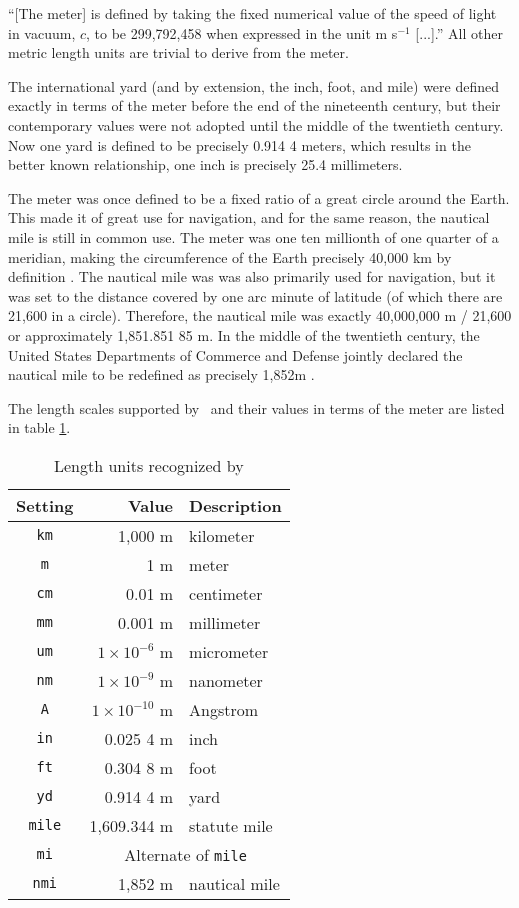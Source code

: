 ``[The meter] is defined by taking the fixed numerical value of the speed of light in vacuum, $c$, to be 299,792,458 when expressed in the unit m s$^{-1}$ [...].''\cite{bipm} All other metric length units are trivial to derive from the meter.

The international yard (and by extension, the inch, foot, and mile) were defined exactly in terms of the meter before the end of the nineteenth century, but their contemporary values were not adopted until the middle of the twentieth century.\cite{nbs:sp477}  Now one yard is defined to be precisely 0.914 4 meters, which results in the better known relationship, one inch is precisely 25.4 millimeters.

The meter was once defined to be a fixed ratio of a great circle around the Earth.  This made it of great use for navigation, and for the same reason, the nautical mile is still in common use.  The meter was one ten millionth of one quarter of a meridian, making the circumference of the Earth precisely 40,000 km by definition \cite{nbs:sp447}.  The nautical mile was was also primarily used for navigation, but it was set to the distance covered by one arc minute of latitude (of which there are 21,600 in a circle).  Therefore, the nautical mile was exactly 40,000,000 m / 21,600 or approximately 1,851.851 85 m.  In the middle of the twentieth century, the United States Departments of Commerce and Defense jointly declared the nautical mile to be redefined as precisely 1,852m \cite{nbs:59:1959}.

The length scales supported by \PM\ and their values in terms of the meter are listed in table \ref{tab:length}.

\begin{table}
\centering
\caption{Length units recognized by \PM}\label{tab:length}
\begin{tabular}{crl}
\hline
Setting & Value & Description\\
\hline
\verb|km| & 1,000 m & kilometer\\
\verb|m| & 1 m & meter\\
\verb|cm| & 0.01 m & centimeter\\
\verb|mm| & 0.001 m & millimeter\\
\verb|um| & $1\times 10^{-6}$ m & micrometer\\
\verb|nm| & $1\times 10^{-9}$ m & nanometer\\
\verb|A| &  $1\times 10^{-10}$ m & Angstrom\\
\verb|in| & 0.025 4 m & inch\\
\verb|ft| & 0.304 8 m & foot\\
\verb|yd| & 0.914 4 m & yard\\
\verb|mile| & 1,609.344 m & statute mile\\
\verb|mi| & \multicolumn{2}{c}{Alternate of \texttt{mile}}\\
\verb|nmi| & 1,852 m & nautical mile\\
\hline
\end{tabular}
\end{table}

